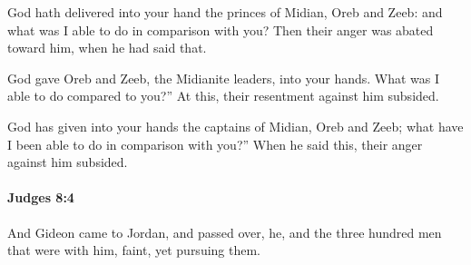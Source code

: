 			\begin{versebox}
					\item[BHS] 
					\item[ASV] God hath delivered into your hand the princes of Midian, Oreb and Zeeb: and what was I able to do in comparison with you? Then their anger was abated toward him, when he had said that.
					\item[NIV] God gave Oreb and Zeeb, the Midianite leaders, into your hands. What was I able to do compared to you?” At this, their resentment against him subsided.
					\item[NRSV] God has given into your hands the captains of Midian, Oreb and Zeeb; what have I been able to do in comparison with you?” When he said this, their anger against him subsided.
			\end{versebox}

		\paragraph{Judges 8:4} %
			\label{JUDGES-8-4}

			And Gideon came to Jordan, and passed over, he, and the three hundred men that were with him, faint, yet pursuing them.

